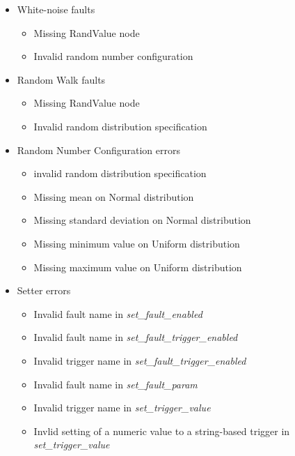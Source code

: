 \documentclass[11pt,fleqn]{report}
\begin{document}
\begin{itemize}
\begin{itemize}
\begin{itemize}
\begin{itemize}
      \end{itemize}
    \item Linear functions
      \begin{itemize}
      \item Missing parameters node
      \item Missing rate
      \end{itemize}
    \end{itemize}
  \item White-noise faults
    \begin{itemize}
    \item Missing RandValue node
    \item Invalid random number configuration
    \end{itemize}
  \item Random Walk faults
    \begin{itemize}
    \item Missing RandValue node
    \item Invalid random distribution specification
    \end{itemize}

  \item Random Number Configuration errors
    \begin{itemize}
    \item invalid random distribution specification
    \item Missing mean on Normal distribution
    \item Missing standard deviation on Normal distribution
    \item Missing minimum value on Uniform distribution
    \item Missing maximum value on Uniform distribution
    \end{itemize}

  \item Setter errors
    \begin{itemize}
    \item Invalid fault name in \textit{set\_fault\_enabled}
    \item Invalid fault name in \textit{set\_fault\_trigger\_enabled}
    \item Invalid trigger name in \textit{set\_fault\_trigger\_enabled}
    \item Invalid fault name in \textit{set\_fault\_param}
    \item Invalid trigger name in \textit{set\_trigger\_value}
    \item Invlid setting of a numeric value to a string-based trigger in
          \textit{set\_trigger\_value}
    \end{itemize}
  \end{itemize}
\end{itemize}
\end{document}
